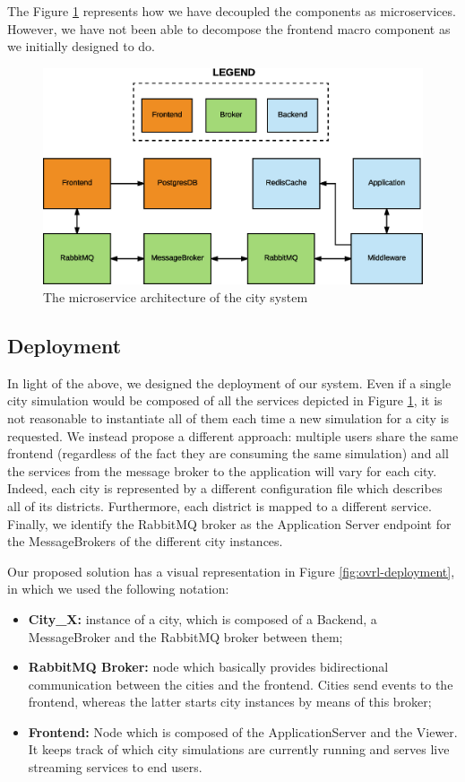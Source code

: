 The Figure \ref{fig:sd-sys-arch-micro} represents how we have decoupled
the components as microservices. However, we have not been able to decompose the
frontend macro component as we initially designed to do.

\begin{figure}[H]
  \centering
  \includegraphics[scale=0.5,keepaspectratio]
    {images/solution/microservices.eps}
  \caption{The microservice architecture of the city system}
  \label{fig:sd-sys-arch-micro}
\end{figure}


\subsection{Deployment}
In light of the above, we designed the deployment of our system. Even
if a single city simulation would be composed of all the services depicted
in Figure
\ref{fig:sd-sys-arch-micro}, it is not reasonable to instantiate all of them
each time a new simulation for a city is requested.
We instead propose a different approach: multiple users share the same frontend
(regardless of the fact they are consuming the same simulation) and all the
services from the message broker to the application will vary for each city.
Indeed, each city is represented by a different configuration file which
describes
all of its districts. Furthermore, each district is mapped to a different
service.
Finally, we identify the RabbitMQ broker as the Application Server endpoint for
the MessageBrokers of the different city instances.

Our proposed solution has a visual representation in Figure
\ref{fig:ovrl-deployment}, in which we used the following notation:

\begin{itemize}
  \item \textbf{City\_X:} instance of a city, which is composed of a Backend,
    a MessageBroker and the RabbitMQ broker between them;
  \item \textbf{RabbitMQ Broker:} node which basically provides bidirectional
    communication between the cities and the frontend. Cities send events to
    the frontend, whereas the latter starts city instances by means of this
    broker;
  \item \textbf{Frontend:} Node which is composed of the ApplicationServer and
    the Viewer. It keeps track of which city simulations are currently
    running and serves live streaming services to end users.
\end{itemize}

